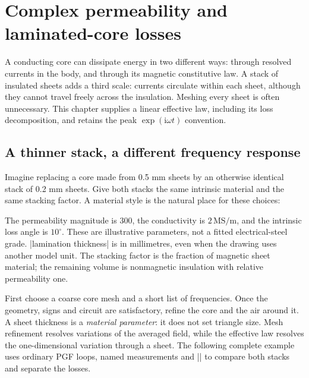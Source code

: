 \section{Complex permeability and laminated-core losses}
\label{sec:losses}

A conducting core can dissipate energy in two different ways: through resolved
currents in the body, and through its magnetic constitutive law. A stack of
insulated sheets adds a third scale: currents circulate within each sheet,
although they cannot travel freely across the insulation. Meshing every sheet
is often unnecessary. This chapter supplies a linear effective law, including
its loss decomposition, and retains the peak $\exp(\mathrm i\omega t)$ convention.

\subsection{A thinner stack, a different frequency response}
Imagine replacing a core made from 0.5 mm sheets by an otherwise identical
stack of 0.2 mm sheets. Give both stacks the same intrinsic material and the
same stacking factor. A material style is the natural place for these choices:
\begin{codeexample}
\end{codeexample}
The permeability magnitude is 300, the conductivity is $2\,\mathrm{MS/m}$,
and the intrinsic loss angle is $10^\circ$. These are illustrative parameters,
not a fitted electrical-steel grade. |lamination thickness| is in millimetres,
even when the drawing uses another model unit. The stacking factor is the
fraction of magnetic sheet material; the remaining volume is nonmagnetic
insulation with relative permeability one.

First choose a coarse core mesh and a short list of frequencies. Once the
geometry, signs and circuit are satisfactory, refine the core and the air
around it. A sheet thickness is a \emph{material parameter}: it does not set
triangle size. Mesh refinement resolves variations of the averaged field,
while the effective law resolves the one-dimensional variation through a sheet.
The following complete example uses ordinary PGF loops, named measurements
and |\femmresultplot| to compare both stacks and separate the losses.

